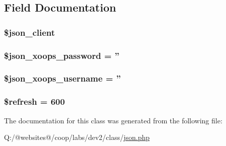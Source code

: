 \subsection{Field Documentation}
\hypertarget{class_j_s_o_n_xortify_exchange_a2d091f9d959cab9ac28ad2cc96149447}{
\subsubsection[{\$json\-\_\-client}]{\setlength{\rightskip}{0pt plus 5cm}\$json\-\_\-client}}\label{class_j_s_o_n_xortify_exchange_a2d091f9d959cab9ac28ad2cc96149447}
\hypertarget{class_j_s_o_n_xortify_exchange_a7af311f07c1c09254920e6ac0cefe9a9}{
\subsubsection[{\$json\-\_\-xoops\-\_\-password}]{\setlength{\rightskip}{0pt plus 5cm}\$json\-\_\-xoops\-\_\-password = ''}}\label{class_j_s_o_n_xortify_exchange_a7af311f07c1c09254920e6ac0cefe9a9}
\hypertarget{class_j_s_o_n_xortify_exchange_ac058687d82a56fb93513e7e58c4ec391}{
\subsubsection[{\$json\-\_\-xoops\-\_\-username}]{\setlength{\rightskip}{0pt plus 5cm}\$json\-\_\-xoops\-\_\-username = ''}}\label{class_j_s_o_n_xortify_exchange_ac058687d82a56fb93513e7e58c4ec391}
\hypertarget{class_j_s_o_n_xortify_exchange_a8527f826b6959aaa92b0e51ee427ba1a}{
\subsubsection[{\$refresh}]{\setlength{\rightskip}{0pt plus 5cm}\$refresh = 600}}\label{class_j_s_o_n_xortify_exchange_a8527f826b6959aaa92b0e51ee427ba1a}


The documentation for this class was generated from the following file\-:\begin{DoxyCompactItemize}
\item 
Q\-:/@websites@/coop/labs/dev2/class/\hyperlink{class_2json_8php}{json.\-php}\end{DoxyCompactItemize}
